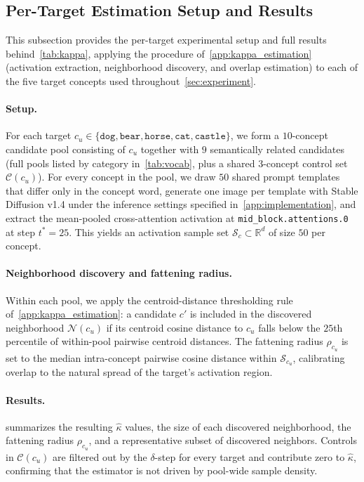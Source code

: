 \subsection{Per-Target Estimation Setup and Results}
\label{app:kappa_per_target}

This subsection provides the per-target experimental setup and full results behind~\cref{tab:kappa}, applying the procedure of~\cref{app:kappa_estimation} (activation extraction, neighborhood discovery, and overlap estimation) to each of the five target concepts used throughout~\cref{sec:experiment}.

\paragraph{Setup.}
For each target $c_u \in \{\texttt{dog}, \texttt{bear}, \texttt{horse}, \texttt{cat}, \texttt{castle}\}$, we form a $10$-concept candidate pool consisting of $c_u$ together with $9$ semantically related candidates (full pools listed by category in~\cref{tab:vocab}, plus a shared $3$-concept control set $\mathcal{C}(c_u)$). For every concept in the pool, we draw $50$ shared prompt templates that differ only in the concept word, generate one image per template with Stable Diffusion v1.4 under the inference settings specified in~\cref{app:implementation}, and extract the mean-pooled cross-attention activation at \texttt{mid\_block.attentions.0} at step $t^*{=}25$. This yields an activation sample set $\mathcal{S}_c \subset \mathbb{R}^d$ of size $50$ per concept.

\paragraph{Neighborhood discovery and fattening radius.}
Within each pool, we apply the centroid-distance thresholding rule of~\cref{app:kappa_estimation}: a candidate $c'$ is included in the discovered neighborhood $\mathcal{N}(c_u)$ if its centroid cosine distance to $c_u$ falls below the $25$th percentile of within-pool pairwise centroid distances. The fattening radius $\rho_{c_u}$ is set to the median intra-concept pairwise cosine distance within $\mathcal{S}_{c_u}$, calibrating overlap to the natural spread of the target's activation region.

\paragraph{Results.}
 summarizes the resulting $\hat\kappa$ values, the size of each discovered neighborhood, the fattening radius $\rho_{c_u}$, and a representative subset of discovered neighbors. Controls in $\mathcal{C}(c_u)$ are filtered out by the $\delta$-step for every target and contribute zero to $\hat\kappa$, confirming that the estimator is not driven by pool-wide sample density.

